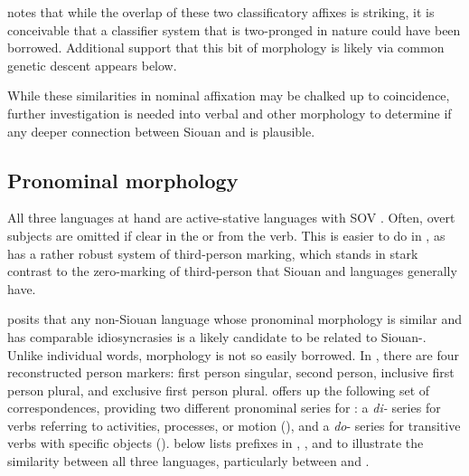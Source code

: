 \documentclass[output=paper]{LSP/langsci}
\begin{document}
\citet{Rankin1998scy} notes that while the overlap of these two classificatory affixes is striking, it is conceivable that a classifier system that is two-pronged in nature could have been borrowed. Additional support that this bit of morphology is likely via common genetic descent appears below.

While these similarities in nominal affixation may be chalked up to coincidence, further investigation is needed into verbal and other morphology to determine if any deeper connection between Siouan and  is plausible.

\subsection{Pronominal morphology}

All three languages at hand are active-stative languages with SOV . Often, overt subjects are omitted if clear in the  or from the verb. This is easier to do in , as  has a rather robust system of third-person marking, which stands in stark contrast to the zero-marking of third-person that Siouan and  languages generally have.

\citet{Rankin1996,Rankin1998scy} posits that any non-Siouan language whose pronominal morphology is similar and has comparable idiosyncrasies is a likely candidate to be related to Siouan-. Unlike individual words, morphology is not so easily borrowed. In , there are four reconstructed person markers: first person singular, second person, inclusive first person plural, and exclusive first person plural. \citet{Rankin1998scy} offers up the following set of correspondences, providing two different pronominal series for : a \emph{di-} series for verbs referring to activities, processes, or motion (\citealt[130]{Linn2000}), and a \emph{do}- series for transitive verbs with specific objects (\citealt[178]{Linn2000}).  below lists  prefixes in , , and  to illustrate the similarity between all three languages, particularly between  and .
\end{document}
